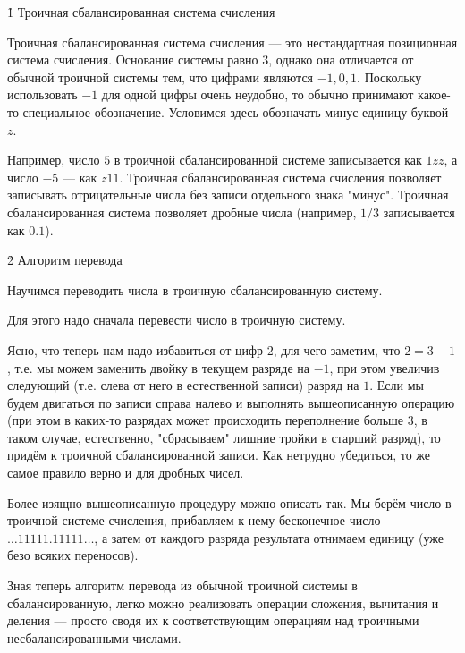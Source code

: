 \h1{ Троичная сбалансированная система счисления }

Троичная сбалансированная система счисления --- это нестандартная позиционная система счисления. Основание системы равно $3$, однако она отличается от обычной троичной системы тем, что цифрами являются $-1, 0, 1$. Поскольку использовать $-1$ для одной цифры очень неудобно, то обычно принимают какое-то специальное обозначение. Условимся здесь обозначать минус единицу буквой $z$.

Например, число $5$ в троичной сбалансированной системе записывается как $1zz$, а число $-5$ --- как $z11$. Троичная сбалансированная система счисления позволяет записывать отрицательные числа без записи отдельного знака "минус". Троичная сбалансированная система позволяет дробные числа (например, $1/3$ записывается как $0.1$).

\h2{ Алгоритм перевода }

Научимся переводить числа в троичную сбалансированную систему.

Для этого надо сначала перевести число в троичную систему.

Ясно, что теперь нам надо избавиться от цифр $2$, для чего заметим, что $2 = 3 - 1$, т.е. мы можем заменить двойку в текущем разряде на $-1$, при этом увеличив следующий (т.е. слева от него в естественной записи) разряд на $1$. Если мы будем двигаться по записи справа налево и выполнять вышеописанную операцию (при этом в каких-то разрядах может происходить переполнение больше $3$, в таком случае, естественно, "сбрасываем" лишние тройки в старший разряд), то придём к троичной сбалансированной записи. Как нетрудно убедиться, то же самое правило верно и для дробных чисел.

Более изящно вышеописанную процедуру можно описать так. Мы берём число в троичной системе счисления, прибавляем к нему бесконечное число $\ldots 11111.11111 \ldots$, а затем от каждого разряда результата отнимаем единицу (уже безо всяких переносов).

Зная теперь алгоритм перевода из обычной троичной системы в сбалансированную, легко можно реализовать операции сложения, вычитания и деления --- просто сводя их к соответствующим операциям над троичными несбалансированными числами.